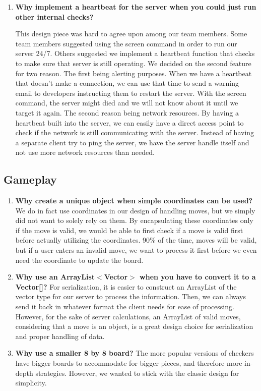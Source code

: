 \documentclass{scrreprt}
\begin{document}
\begin{enumerate} [label*=\arabic*.]
				\item \textbf{Why implement a heartbeat for the server when you could just run other internal checks?}

				This design piece was hard to agree upon among our team members. Some team members suggested using the screen command in order to run our server 24/7. Others suggested we implement a heartbeat function that checks to make sure that server is still operating. We decided on the second feature for two reason. The first being alerting purposes. When we have a heartbeat that doesn't make a connection, we can use that time to send a warning email to developers instructing them to restart the server. With the screen command, the server might died and we will not know about it until we target it again. The second reason being network resources. By having a heartbeat built into the server, we can easily have a direct access point to check if the network is still communicating with the server. Instead of having a separate client try to ping the server, we have the server handle itself and not use more network resources than needed.

			\end{enumerate}

		\subsection {Gameplay}
			\begin{enumerate}

			\item \textbf{Why create a unique object when simple coordinates can be used?}
			We do in fact use coordinates in our design of handling moves, but we simply did not want to solely rely on them. By encapsulating these coordinates only if the move is valid, we would be able to first check if a move is valid first before actually utilizing the coordinates. 90\% of the time, moves will be valid, but if a user enters an invalid move, we want to process it first before we even need the coordinate to update the board. 

			\item \textbf{Why use an ArrayList$<$Vector$>$ when you have to convert it to a Vector[]?}
			For serialization, it is easier to construct an ArrayList of the vector type for our server to process the information. Then, we can always send it back in whatever format the client needs for ease of processing. However, for the sake of server calculations, an ArrayList of valid moves, considering that a move is an object, is a great design choice for serialization and proper handling of data.

			\item \textbf{Why use a smaller 8 by 8 board?}
			The more popular versions of checkers have bigger boards to accommodate for bigger pieces, and therefore more in-depth strategies. However, we wanted to stick with the classic design for simplicity.
			\end{enumerate}
\end{document}
